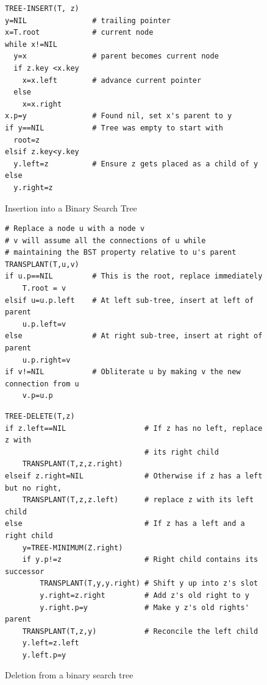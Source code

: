 \documentclass[10pt,a4paper]{article}
\begin{document}
\begin{figure}
\caption{Insertion into a Binary Search Tree}
\begin{center}
\begin{lstlisting}
TREE-INSERT(T, z)
y=NIL     			# trailing pointer
x=T.root  			# current node 
while x!=NIL		
  y=x				# parent becomes current node
  if z.key <x.key	
    x=x.left		# advance current pointer
  else
    x=x.right
x.p=y				# Found nil, set x's parent to y				
if y==NIL			# Tree was empty to start with
  root=z	
elsif z.key<y.key
  y.left=z			# Ensure z gets placed as a child of y
else
  y.right=z
\end{lstlisting}
\label{bstinsert}
\end{center}
\end{figure}



\begin{figure}
\caption{Deletion from a binary search tree}
\begin{center}
\begin{lstlisting}
# Replace a node u with a node v
# v will assume all the connections of u while 
# maintaining the BST property relative to u's parent
TRANSPLANT(T,u,v)
if u.p==NIL			# This is the root, replace immediately
	T.root = v
elsif u=u.p.left	# At left sub-tree, insert at left of parent
	u.p.left=v
else				# At right sub-tree, insert at right of parent
	u.p.right=v
if v!=NIL			# Obliterate u by making v the new connection from u
	v.p=u.p
\end{lstlisting}
\begin{lstlisting}
TREE-DELETE(T,z)
if z.left==NIL					# If z has no left, replace z with 
								# its right child
	TRANSPLANT(T,z,z.right)
elseif z.right=NIL				# Otherwise if z has a left but no right, 
	TRANSPLANT(T,z,z.left)		# replace z with its left child	
else 							# If z has a left and a right child
	y=TREE-MINIMUM(Z.right)		
	if y.p!=z					# Right child contains its successor 	
		TRANSPLANT(T,y,y.right) # Shift y up into z's slot
		y.right=z.right     	# Add z's old right to y
		y.right.p=y             # Make y z's old rights' parent
	TRANSPLANT(T,z,y)			# Reconcile the left child 
	y.left=z.left				
	y.left.p=y
\end{lstlisting}
\label{bstdeletion}
\end{center}
\end{figure}
\end{document}
